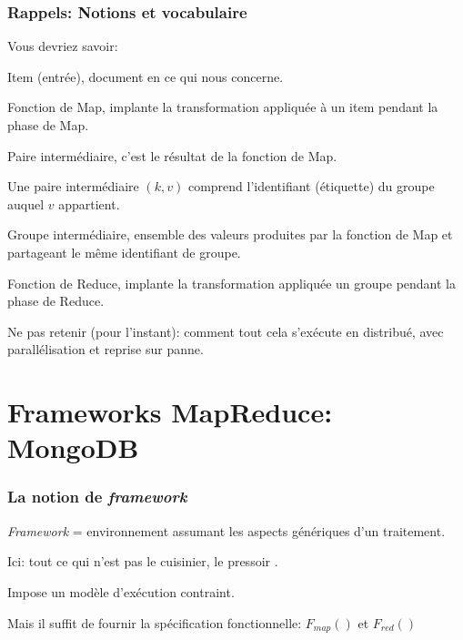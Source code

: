 

\begin{frame}[fragile]
\frametitle{Rappels: Notions et vocabulaire}

Vous devriez savoir: 
\begin{redbullet}
  \item \alert{Item (entrée)}, \alert{document} en ce qui nous concerne.
  
  \item \alert{Fonction de Map}, implante la transformation appliquée à un item pendant la phase de Map.

  \item \alert{Paire intermédiaire}, c'est le résultat de la fonction de Map. 
  
  Une paire intermédiaire $(k, v)$ comprend l'identifiant (étiquette) du groupe auquel
  $v$ appartient.

  \item \alert{Groupe intermédiaire}, ensemble des valeurs produites par la fonction
  de Map et partageant le même identifiant de groupe.
  
    \item \alert{Fonction de Reduce}, implante la transformation appliquée un groupe
    pendant la phase de Reduce.
    
\end{redbullet}

\alert{Ne pas retenir (pour l'instant)}: comment tout cela s'exécute en distribué, avec
parallélisation et reprise sur panne.

\end{frame}


\section{Frameworks MapReduce: MongoDB}



\begin{frame}[fragile]
\frametitle{La notion de \textit{framework}}

\textit{Framework} = environnement assumant les aspects \alert{génériques} d'un traitement.

\vfill
Ici: tout ce qui n'est pas le cuisinier, le pressoir .


\begin{redbullet}
  \item Impose un modèle d'exécution contraint.
  \item Mais il suffit de fournir la spécification \alert{fonctionnelle}: $F_{map}()$ et $F_{red}()$
\end{redbullet}

\end{frame}


